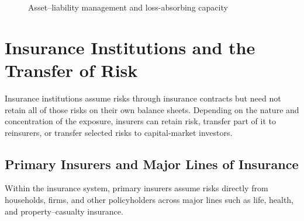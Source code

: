 \begin{figure}[H]
\centering
{}

\caption{Asset--liability management and loss-absorbing capacity}
\label{fig}
\end{figure}


\section[Insurance Institutions and the Transfer of Risk]{Insurance Institutions and the Transfer of Risk}

Insurance institutions assume risks through insurance contracts but need not retain all of those risks on their own balance sheets. Depending on the nature and concentration of the exposure, insurers can retain risk, transfer part of it to reinsurers, or transfer selected risks to capital-market investors.

\subsection{Primary Insurers and Major Lines of Insurance}

Within the insurance system, primary insurers assume risks directly from households, firms, and other policyholders across major lines such as life, health, and property--casualty insurance.

